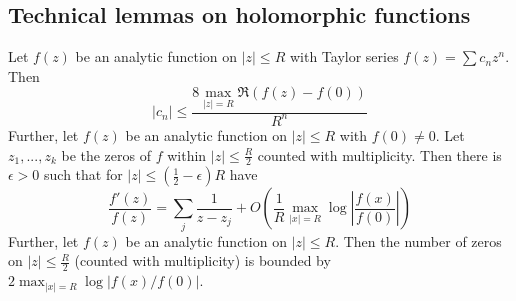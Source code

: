 \subsection{Technical lemmas on holomorphic functions}
\label{bounds_complex_analytic_functions}
Let $f(z)$ be an analytic function on $|z| \leq R$ with Taylor series $f(z) = \sum c_n z^n$. Then
\begin{equation*}
    |c_n| \leq \frac {8 \max_{|z| = R} \Re(f(z) - f(0))} {R^n}
\end{equation*}
Further, let $f(z)$ be an analytic function on $|z| \leq R$ with $f(0) \neq 0$.
Let $z_1, ..., z_k$ be the zeros of $f$ within $|z| \leq \frac R 2$ counted with multiplicity.
Then there is $\epsilon > 0$ such that for $|z| \leq (\frac 1 2 - \epsilon)R$ have
\begin{equation*}
    \frac {f'(z)} {f(z)} = \sum_j \frac 1 {z - z_j} + O\left( \frac 1 R \max_{|x| = R} \log\left| \frac {f(x)} {f(0)} \right| \right)
\end{equation*}
Further, let $f(z)$ be an analytic function on $|z| \leq R$.
Then the number of zeros on $|z| \leq \frac R 2$ (counted with multiplicity) is bounded by $2\max_{|x| = R} \log\left| f(x)/f(0) \right|$.
